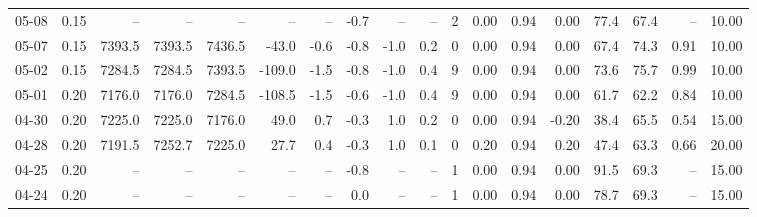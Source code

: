\begin{threeparttable}
{\begin{tabular}{lrrrrrrrrrrrrrrrrr}
  05-08 &     0.15 &     -- &     -- &     -- &         -- &             -- &                      -0.7 &                       -- &                  -- &              2 &       0.00 &      0.94 &           0.00 &             77.4 &                67.4 &              -- &                  10.00 \\
  05-07 &     0.15 & 7393.5 & 7393.5 & 7436.5 &      -43.0 &           -0.6 &                      -0.8 &                     -1.0 &                 0.2 &              0 &       0.00 &      0.94 &           0.00 &             67.4 &                74.3 &            0.91 &                  10.00 \\
  05-02 &     0.15 & 7284.5 & 7284.5 & 7393.5 &     -109.0 &           -1.5 &                      -0.8 &                     -1.0 &                 0.4 &              9 &       0.00 &      0.94 &           0.00 &             73.6 &                75.7 &            0.99 &                  10.00 \\
  05-01 &     0.20 & 7176.0 & 7176.0 & 7284.5 &     -108.5 &           -1.5 &                      -0.6 &                     -1.0 &                 0.4 &              9 &       0.00 &      0.94 &           0.00 &             61.7 &                62.2 &            0.84 &                  10.00 \\
  04-30 &     0.20 & 7225.0 & 7225.0 & 7176.0 &       49.0 &            0.7 &                      -0.3 &                      1.0 &                 0.2 &              0 &       0.00 &      0.94 &          -0.20 &             38.4 &                65.5 &            0.54 &                  15.00 \\
  04-28 &     0.20 & 7191.5 & 7252.7 & 7225.0 &       27.7 &            0.4 &                      -0.3 &                      1.0 &                 0.1 &              0 &       0.20 &      0.94 &           0.20 &             47.4 &                63.3 &            0.66 &                  20.00 \\
  04-25 &     0.20 &     -- &     -- &     -- &         -- &             -- &                      -0.8 &                       -- &                  -- &              1 &       0.00 &      0.94 &           0.00 &             91.5 &                69.3 &              -- &                  15.00 \\
  04-24 &     0.20 &     -- &     -- &     -- &         -- &             -- &                       0.0 &                       -- &                  -- &              1 &       0.00 &      0.94 &           0.00 &             78.7 &                69.3 &              -- &                  15.00 \\

\end{tabular}}
\end{threeparttable}
